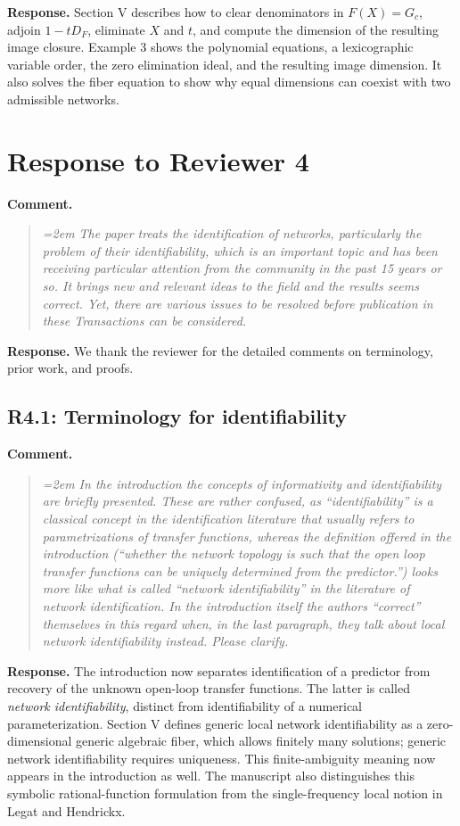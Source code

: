 \documentclass[11pt]{article}
\begin{document}
\textbf{Response.} Section V describes how to clear denominators in
$F(X)=G_c$, adjoin $1-tD_F$, eliminate $X$ and $t$, and compute the
dimension of the resulting image closure. Example 3 shows the polynomial
equations, a lexicographic variable order, the zero elimination ideal,
and the resulting image dimension. It also solves the fiber equation to
show why equal dimensions can coexist with two admissible networks.

\section*{Response to Reviewer 4}

\textbf{Comment.}
\begin{quote}\itshape\emergencystretch=2em
The paper treats the identification of networks, particularly the problem of their identifiability, which is an important topic and has been receiving particular attention from the community in the past 15 years or so. It brings new and relevant ideas to the field and the results seems correct. Yet, there are various issues to be resolved before publication in these Transactions can be considered.
\end{quote}

\textbf{Response.} We thank the reviewer for the detailed comments on terminology, prior work, and proofs.

\subsection*{R4.1: Terminology for identifiability}
\textbf{Comment.}
\begin{quote}\itshape\emergencystretch=2em
In the introduction the concepts of informativity and identifiability are briefly presented. These are rather confused, as ``identifiability'' is a classical concept in the identification literature that usually refers to parametrizations of transfer functions, whereas the definition offered in the introduction (``whether the network topology is such that the open loop transfer functions can be uniquely determined from the predictor.'') looks more like what is called ``network identifiability'' in the literature of network identification. In the introduction itself the authors ``correct'' themselves in this regard when, in the last paragraph, they talk about local network identifiability instead. Please clarify.
\end{quote}

\textbf{Response.} The introduction now separates identification of a
predictor from recovery of the unknown open-loop transfer functions. The
latter is called \emph{network identifiability}, distinct from
identifiability of a numerical parameterization. Section V defines generic
local network identifiability as a zero-dimensional generic algebraic
fiber, which allows finitely many solutions; generic network
identifiability requires uniqueness. This finite-ambiguity meaning now
appears in the introduction as well. The manuscript also distinguishes
this symbolic rational-function formulation from the single-frequency
local notion in Legat and Hendrickx.
\end{document}
